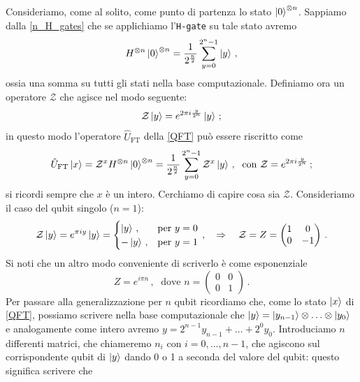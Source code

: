\noindent Consideriamo, come al solito, come punto di partenza lo stato $\ket 0^{\otimes n}$. Sappiamo dalla \eqref{n_H_gates} che se applichiamo l'\texttt{H-gate} su tale stato avremo
\begin{equation*}
    H^{\otimes n}\ket{0}^{\otimes n} = \frac{1}{2^{\frac n2}}\sum_{y=0}^{2^n-1} \ket y \, ,
\end{equation*}
ossia una somma su tutti gli stati nella base computazionale. Definiamo ora un operatore $\mathcal{Z}$ che agisce nel modo seguente:
\begin{equation*}
    \mathcal{Z}\ket y = e^{2\pi i \frac{y}{2^n}}\ket y \, ;
\end{equation*}
in questo modo l'operatore $\hat U_{\text{FT}}$ della \eqref{QFT} può essere riscritto come
\begin{equation}\label{QFT_with_Z}
    \hat U_{\text{FT}}\ket x = \mathcal{Z}^xH^{\otimes n}\ket{0}^{\otimes n} = \frac{1}{2^{\frac n2}}\sum_{y=0}^{2^n-1} \mathcal{Z}^x \ket y \, , \; \text{ con } \mathcal{Z} = e^{2\pi i \frac{y}{2^n}} \, ;
\end{equation}
si ricordi sempre che $x$ è un intero. Cerchiamo di capire cosa sia $\mathcal Z$. Consideriamo il caso del qubit singolo ($n=1$):
\begin{equation*}
    \mathcal{Z}\ket y = e^{\pi i y}\ket{y} = 
    \begin{cases}
        \ket{y} \, , &\text{per } y = 0 \\
        -\ket{y} \, , &\text{per } y = 1
    \end{cases}
    \, , \quad \Rightarrow \quad \mathcal{Z} = Z = 
    \begin{pmatrix}
        1 & 0 \\ 0 & -1
    \end{pmatrix} \, .
\end{equation*}
Si noti che un altro modo conveniente di scriverlo è come esponenziale
\begin{equation*}
    Z = e^{i \pi n} \, , \; \text{ dove } n = 
    \begin{pmatrix}
        0 & 0 \\ 0 & 1
    \end{pmatrix} \, .
\end{equation*}
Per passare alla generalizzazione per $n$ qubit ricordiamo che, come lo stato $\ket{x}$ di \eqref{QFT}, possiamo scrivere nella base computazionale che $ \ket y = \ket{y_{n-1}} \otimes \ldots \otimes \ket{y_0}$ e analogamente come intero avremo $y = 2^{n-1} y_{n-1} + \ldots + 2^0 y_0$. Introduciamo $n$ differenti matrici, che chiameremo $n_i$ con $i = 0, \ldots, n-1$, che agiscono sul corrispondente qubit di $\ket{y}$ dando 0 o 1 a seconda del valore del qubit: questo significa scrivere che
